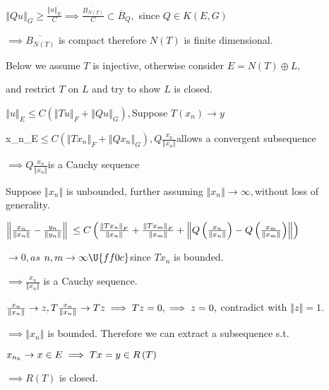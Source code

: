 \documentclass{article}
\begin{document}
$\left\Vert Qu\right\Vert _{G}\geq \frac{\left\Vert u\right\Vert _{E}}{C}%
\implies \frac{\overline{B_{N\left( T\right) }}}{C}\subset \overline{B}_{Q},$%
since $Q\in K\left( E,G\right) $

$\implies \overline{B_{N\left( T\right) }}$ is compact therefore $N\left(
T\right) $ is finite dimensional.

Below we assume $T$ is injective, otherwise consider $E=N\left( T\right)
\oplus L,$

and restrict $T$ on $L$ and try to show $L$ is closed.

\bigskip $\left\Vert u\right\Vert _{E}\leq C\left( \left\Vert Tu\right\Vert
_{F}+\left\Vert Qu\right\Vert _{G}\right) ,$Suppose $T\left( x_{n}\right)
\rightarrow y$

\left\Vert x_{n}\right\Vert _{E}$\leq C\left( \left\Vert Tx_{n}\right\Vert
_{F}+\left\Vert Qx_{n}\right\Vert _{G}\right) ,Q\frac{x_{n}}{\left\Vert
x_{n}\right\Vert }$allows a convergent subsequence 

$\implies Q\frac{x_{n}}{\left\Vert x_{n}\right\Vert }$is a Cauchy sequence

Suppose $\left\Vert x_{n}\right\Vert $ is unbounded, further assuming $%
\left\Vert x_{n}\right\Vert \rightarrow \infty ,$without loss of generality.

$\left\Vert \frac{x_{n}}{\left\Vert x_{n}\right\Vert }-\frac{y_{n}}{%
\left\Vert y_{n}\right\Vert }\right\Vert $ $\leq C\left( \frac{\left\Vert
Tx_{n}\right\Vert _{F}}{\left\Vert x_{n}\right\Vert }+\frac{\left\Vert
Tx_{m}\right\Vert _{F}}{\left\Vert x_{m}\right\Vert }+\left\Vert Q\left( 
\frac{x_{n}}{\left\Vert x_{n}\right\Vert }\right) -Q\left( \frac{x_{m}}{%
\left\Vert x_{m}\right\Vert }\right) \right\Vert \right) $

$\rightarrow 0,as$ $n,m\rightarrow \infty \U{ff0c} $since $Tx_{n}$ is
bounded.

$\implies \frac{x_{n}}{\left\Vert x_{n}\right\Vert }$ is a Cauchy sequence. 

$\frac{x_{n}}{\left\Vert x_{n}\right\Vert }\rightarrow z,T\frac{x_{n}}{%
\left\Vert x_{n}\right\Vert }\rightarrow Tz\implies Tz=0,\implies z=0,$%
contradict with $\left\Vert z\right\Vert =1.$

$\implies \left\Vert x_{n}\right\Vert $ is bounded. Therefore we can extract
a subsequence s.t.

$\bigskip x_{n_{k}}\rightarrow x\in E\implies Tx=y\in R\left( T\right) $

$\implies R\left( T\right) $ is closed.
\end{document}
